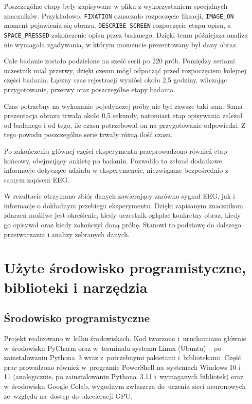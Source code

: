 \documentclass[12pt,a4paper,numbers=enddot,headings=small]{scrartcl} %
\begin{document}
	Poszczególne etapy były zapisywane w pliku z wykorzystaniem specjalnych znaczników. Przykładowo, \texttt{FIXATION} oznaczało rozpoczęcie fiksacji, \texttt{IMAGE\_ON} moment pojawienia się obrazu, \texttt{DESCRIBE\_SCREEN} rozpoczęcie etapu opisu, a \texttt{SPACE\_PRESSED} zakończenie opisu przez badanego. Dzięki temu późniejsza analiza nie wymagała zgadywania, w którym momencie prezentowany był dany obraz.
	
	Całe badanie zostało podzielone na sześć serii po 220 prób. Pomiędzy seriami uczestnik miał przerwy, dzięki czemu mógł odpocząć przed rozpoczęciem kolejnej części badania. Łączny czas rejestracji wyniósł około 2,5 godziny, wliczając przygotowanie, przerwy oraz poszczególne etapy badania.
	
	Czas potrzebny na wykonanie pojedynczej próby nie był zawsze taki sam. Sama prezentacja obrazu trwała około 0,5 sekundy, natomiast etap opisywania zależał od badanego i od tego, ile czasu potrzebował on na przygotowanie odpowiedzi. Z tego powodu poszczególne serie trwały różną ilość czasu.
	
	Po zakończeniu głównej części eksperymentu przeprowadzono również etap końcowy, obejmujący ankietę po badaniu. Pozwoliło to zebrać dodatkowe informacje dotyczące udziału w eksperymencie, niezwiązane bezpośrednio z samym zapisem EEG.
	
	W rezultacie otrzymano zbiór danych zawierający zarówno sygnał EEG, jak i informacje o dokładnym przebiegu eksperymentu. Dzięki zapisanym znacznikom zdarzeń możliwe jest określenie, kiedy uczestnik oglądał konkretny obraz, kiedy go opisywał oraz kiedy zakończył daną próbę. Stanowi to podstawę do dalszego przetwarzania i analizy zebranych danych.
	
	\section{Użyte środowisko programistyczne, biblioteki i narzędzia}
	
	\subsection{Środowisko programistyczne}
	
	Projekt realizowano w~kilku środowiskach. Kod tworzono i~uruchamiano głównie
	w~środowisku PyCharm oraz w~terminalu systemu Linux (Ubuntu) -- po
	zainstalowaniu Pythona~3 wraz z~potrzebnymi pakietami i~bibliotekami. Część
	prac prowadzono również w~programie PowerShell na~systemach Windows 10 i 11 (analogicznie,
	po zainstalowaniu Pythona~3.11 i~wymaganych bibliotek) oraz w~środowisku Google
	Colab, wygodnym zwłaszcza do~uczenia sieci neuronowych ze~względu na~dostęp
	do~akceleracji GPU.
	
\end{document}
